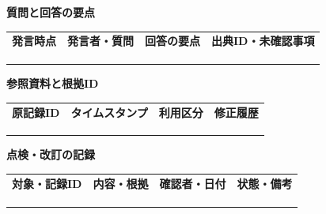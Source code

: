 \documentclass[11pt,a4paper]{article}
\begin{document}
\par{}\noindent\textbf{質問と回答の要点}\par\vspace{1mm}
{\fontsize{8.5}{13}\selectfont
\begin{tabularx}{\linewidth}{@{}XXXX@{}}
\textbf{発言時点} & \textbf{発言者・質問} & \textbf{回答の要点} & \textbf{出典ID・未確認事項}\\[2mm]
\strut & \strut & \strut & \strut\\[5mm]
\strut & \strut & \strut & \strut\\[5mm]
\strut & \strut & \strut & \strut\\[5mm]
\end{tabularx}
}\vspace{2mm}\par
{}
\par{}\noindent\textbf{参照資料と根拠ID}\par\vspace{1mm}
{\fontsize{8.5}{13}\selectfont
\begin{tabularx}{\linewidth}{@{}XXXX@{}}
\textbf{原記録ID} & \textbf{タイムスタンプ} & \textbf{利用区分} & \textbf{修正履歴}\\[2mm]
\strut & \strut & \strut & \strut\\[5mm]
\strut & \strut & \strut & \strut\\[5mm]
\strut & \strut & \strut & \strut\\[5mm]
\end{tabularx}
}\vspace{2mm}\par
{}
\par{}\noindent\textbf{点検・改訂の記録}\par\vspace{1mm}
{\fontsize{8.5}{13}\selectfont
\begin{tabularx}{\linewidth}{@{}XXXX@{}}
\textbf{対象・記録ID} & \textbf{内容・根拠} & \textbf{確認者・日付} & \textbf{状態・備考}\\[2mm]
\strut & \strut & \strut & \strut\\[5mm]
\strut & \strut & \strut & \strut\\[5mm]
\strut & \strut & \strut & \strut\\[5mm]
\end{tabularx}
}\vspace{2mm}\par
\end{document}
